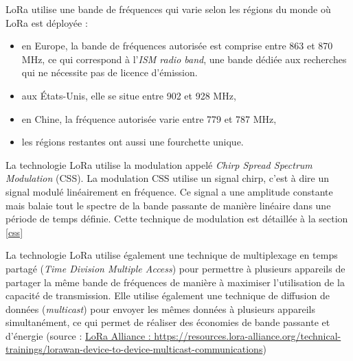 \vspace{0.1cm}

LoRa utilise une bande de fréquences qui varie selon les régions du monde où LoRa est déployée :

\vspace{0.1cm}

\begin{itemize}
\item en Europe, la bande de fréquences autorisée est comprise entre 863 et 870 MHz, ce qui correspond à l'\textit{ISM radio band}, une bande dédiée aux recherches qui ne nécessite pas de licence d'émission.
\item aux États-Unis, elle se situe entre 902 et 928 MHz,
\item en Chine, la fréquence autorisée varie entre 779 et 787 MHz,
\item les régions restantes ont aussi une fourchette unique.
\end{itemize}

\vspace{0.1cm}

La technologie LoRa utilise la modulation appelé \textit{Chirp Spread Spectrum Modulation} (CSS). La modulation CSS utilise un signal chirp, c'est à dire un signal modulé linéairement en fréquence. Ce signal a une amplitude constante mais balaie tout le spectre de la bande passante de manière linéaire dans une période de temps définie. Cette technique de modulation est détaillée à la section \ref{css}

\vspace{0.1cm}

La technologie LoRa utilise également une technique de multiplexage en temps partagé (\textit{Time Division Multiple Access}) pour permettre à plusieurs appareils de partager la même bande de fréquences de manière à maximiser l'utilisation de la capacité de transmission. Elle utilise également une technique de diffusion de données (\textit{multicast}) pour envoyer les mêmes données à plusieurs appareils simultanément, ce qui permet de réaliser des économies de bande passante et d'énergie (source : \href{https://resources.lora-alliance.org/technical-trainings/lorawan-device-to-device-multicast-communications}{LoRa Alliance : https://resources.lora-alliance.org/technical-trainings/lorawan-device-to-device-multicast-communications})

\vspace{0.1cm}

